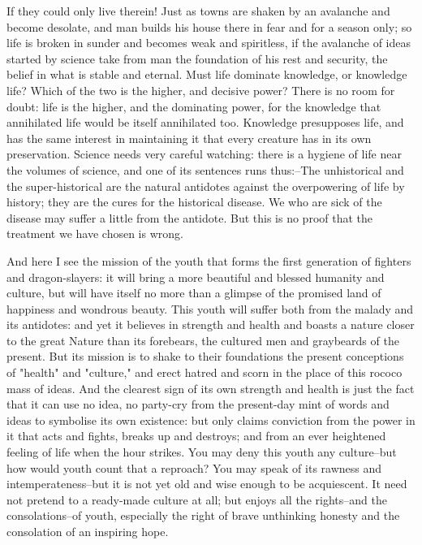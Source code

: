 If they could only live therein! Just as towns are shaken by an
avalanche and become desolate, and man builds his house there in fear
and for a season only; so life is broken in sunder and becomes weak
and spiritless, if the avalanche of ideas started by science take
from man the foundation of his rest and security, the belief in what
is stable and eternal. Must life dominate knowledge, or knowledge
life? Which of the two is the higher, and decisive power? There is no
room for doubt: life is the higher, and the dominating power, for the
knowledge that annihilated life would be itself annihilated too.
Knowledge presupposes life, and has the same interest in maintaining
it that every creature has in its own preservation. Science needs
very careful watching: there is a hygiene of life near the volumes of
science, and one of its sentences runs thus:--The unhistorical and
the super-historical are the natural antidotes against the
overpowering of life by history; they are the cures for the
historical disease. We who are sick of the disease may suffer a
little from the antidote. But this is no proof that the treatment we
have chosen is wrong.

And here I see the mission of the youth that forms the first
generation of fighters and dragon-slayers: it will bring a more
beautiful and blessed humanity and culture, but will have itself no
more than a glimpse of the promised land of happiness and wondrous
beauty. This youth will suffer both from the malady and its
antidotes: and yet it believes in strength and health and boasts a
nature closer to the great Nature than its forebears, the cultured
men and graybeards of the present. But its mission is to shake to
their foundations the present conceptions of "health" and "culture,"
and erect hatred and scorn in the place of this rococo mass of ideas.
And the clearest sign of its own strength and health is just the fact
that it can use no idea, no party-cry from the present-day mint of
words and ideas to symbolise its own existence: but only claims
conviction from the power in it that acts and fights, breaks up and
destroys; and from an ever heightened feeling of life when the hour
strikes. You may deny this youth any culture--but how would youth
count that a reproach? You may speak of its rawness and
intemperateness--but it is not yet old and wise enough to be
acquiescent. It need not pretend to a ready-made culture at all; but
enjoys all the rights--and the consolations--of youth, especially the
right of brave unthinking honesty and the consolation of an inspiring
hope.

